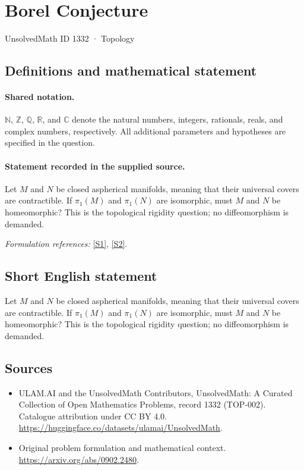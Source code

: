 \documentclass[11pt]{article}
\newcommand{\sref}[2]{\hyperlink{source:#1:#2}{[S#2]}}
\begin{document}
\setcounter{section}{1331}
\section{Borel Conjecture}\label{1332}
{\small UnsolvedMath ID 1332 · Topology}
\subsection{Definitions and mathematical statement}

\paragraph{Shared notation.}$\mathbb N$, $\mathbb Z$, $\mathbb Q$, $\mathbb R$, and $\mathbb C$ denote the natural numbers, integers, rationals, reals, and complex numbers, respectively. All additional parameters and hypotheses are specified in the question.


\paragraph{Statement recorded in the supplied source.}
Let $M$ and $N$ be closed aspherical manifolds, meaning that their universal covers are contractible. If $\pi_1(M)$ and $\pi_1(N)$ are isomorphic, must $M$ and $N$ be homeomorphic? This is the topological rigidity question; no diffeomorphism is demanded.
\par\smallskip\textit{Formulation references:} \sref{1332}{1}, \sref{1332}{2}.
\subsection{Short English statement}
Let $M$ and $N$ be closed aspherical manifolds, meaning that their universal covers are contractible. If $\pi_1(M)$ and $\pi_1(N)$ are isomorphic, must $M$ and $N$ be homeomorphic? This is the topological rigidity question; no diffeomorphism is demanded.
\subsection{Sources}
\begin{itemize}
\item[\hypertarget{source:1332:1}{S1}] ULAM.AI and the UnsolvedMath Contributors, UnsolvedMath: A Curated Collection of Open Mathematics Problems, record 1332 (TOP-002). Catalogue attribution under CC BY 4.0.
\url{https://huggingface.co/datasets/ulamai/UnsolvedMath}.
\item[\hypertarget{source:1332:2}{S2}] Original problem formulation and mathematical context.
\url{https://arxiv.org/abs/0902.2480}.
\end{itemize}
\label{end:1332}
\end{document}
